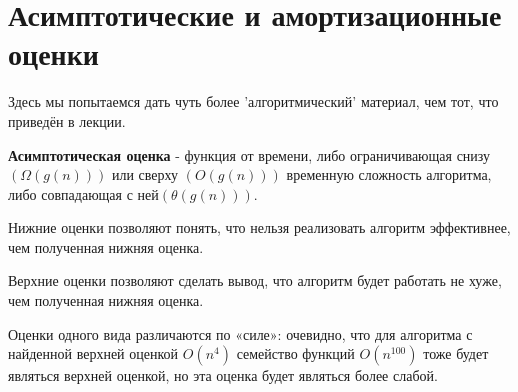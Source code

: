 \section{Асимптотические и амортизационные оценки}
\begin{notice}
    Здесь мы попытаемся дать чуть более 'алгоритмический' материал, чем тот, что приведён в лекции.
\end{notice}

\begin{definition}
    \textbf{Асимптотическая оценка} - функция от времени, либо ограничивающая снизу $(\Omega(g(n)))$ или сверху $(O(g(n)))$ временную сложность алгоритма, либо совпадающая с ней$(\theta(g(n)))$.
\end{definition}

Нижние  оценки  позволяют  понять,  что  нельзя  реализовать  алгоритм эффективнее, чем полученная нижняя оценка.

Верхние оценки позволяют сделать вывод, что алгоритм будет работать не хуже, чем полученная нижняя оценка.

Оценки  одного  вида  различаются  по  «силе»:  очевидно,  что  для алгоритма с найденной верхней оценкой $O(n^4)$ семейство функций $O(n^{100})$ тоже будет являться  верхней  оценкой, но  эта  оценка  будет  являться  более слабой.

